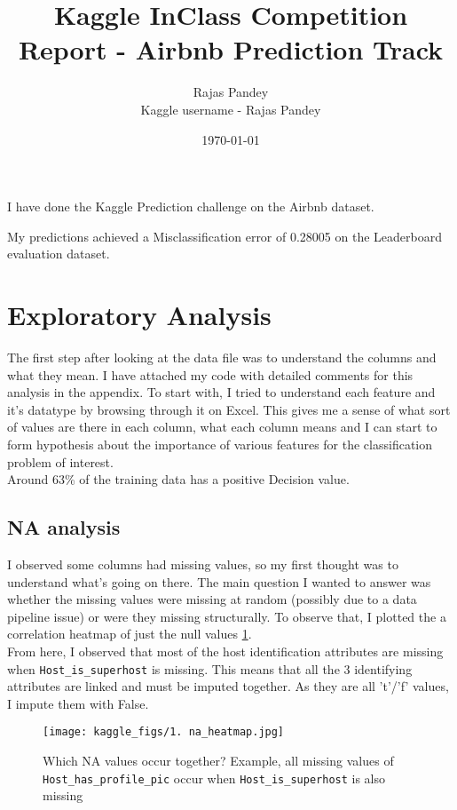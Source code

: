 \documentclass[12pt]{article}
\title{Kaggle InClass Competition Report - Airbnb Prediction Track}
\author{Rajas Pandey\\
Kaggle username - Rajas Pandey
}
\date{\today \\
}
\theoremstyle{definition}
\begin{document}
\maketitle

I have done the Kaggle Prediction challenge on the Airbnb dataset.

My predictions achieved a Misclassification error of 0.28005 on the Leaderboard evaluation dataset. 
\section{Exploratory Analysis}
The first step after looking at the data file was to understand the columns and what they mean. I have attached my code with detailed comments for this analysis in the appendix. To start with, I tried to understand each feature and it's datatype by browsing through it on Excel. This gives me a sense of what sort of values are there in each column, what each column means and I can start to form hypothesis about the importance of various features for the classification problem of interest. \\

Around 63\% of the training data has a positive Decision value.

\subsection{NA analysis}
I observed some columns had missing values, so my first thought was to understand what's going on there. The main question I wanted to answer was whether the missing values were missing at random (possibly due to a data pipeline issue) or were they missing structurally. To observe that, I plotted the a correlation heatmap of just the null values \ref{fig:na_heatmap}.\\

From here, I observed that most of the host identification attributes are missing when \texttt{Host\_is\_superhost} is missing. This means that all the 3 identifying attributes are linked and must be imputed together. As they are all 't'/'f' values, I impute them with False.\\


\begin{figure}
\centering
\texttt{[image: kaggle\_figs/1. na\_heatmap.jpg]}
\caption{\label{fig:na_heatmap}Which NA values occur together? Example, all missing values of \texttt{Host\_has\_profile\_pic} occur when \texttt{Host\_is\_superhost} is also missing}
\end{figure}
\end{document}
